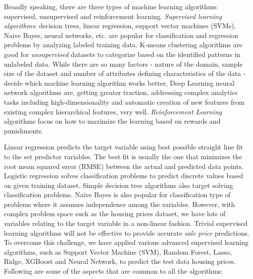 \documentclass[sigconf]{acmart}
\begin{document}
	Broadly speaking, there are three types of machine learning algorithms: supervised, unsupervised and reinforcement learning. {\em Supervised learning algorithms}: decision trees, linear regression, support vector machines (SVMs), Naive Bayes, neural networks, etc. are popular for classification and regression problems by analyzing labeled training data. K-means clustering algorithms are good for {\em unsupervised} datasets to categorize based on the identified patterns in unlabeled data. While there are so many factors - nature of the domain, sample size of the dataset and number of attributes defining characteristics of the data - decide which machine learning algorithm works better, Deep Learning neural network algorithms are, getting greater traction, addressing complex analytics tasks including high-dimensionality and automatic creation of new features from existing complex hierarchical features, very well. {\em Reinforcement Learning} algorithms focus on how to maximize the learning based on rewards and punishments.
		
	Linear regression predicts the target variable using best possible straight line fit to the set predictor variables. The best fit is usually the one that minimizes the root mean squared error (RMSE) between the actual and predicted data points. Logistic regression solves classification problems to predict discrete values based on given training dataset. Simple decision tree algorithms also target solving classification problems. Naive Bayes is also popular for classification type of problems where it assumes independence among the variables. However, with complex problem space such as the housing prices dataset, we have lots of variables relating to the target variable in a non-linear fashion. Trivial supervised learning algorithms will not be effective to provide accurate {\em sale price} predictions. To overcome this challenge, we have applied various advanced supervised learning algorithms, such as Support Vector Machine (SVM), Random Forest, Lasso, Ridge, XGBoost and Neural Network, to predict the test data housing prices. Following are some of the aspects that are common to all the algorithms:
	
\end{document}
